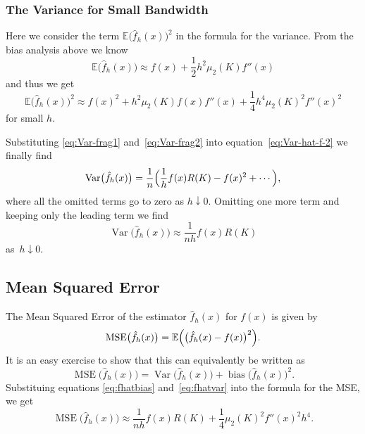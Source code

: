 \documentclass[
  a4paper,
]{article}
\theoremstyle{definition}
\theoremstyle{definition}
\theoremstyle{definition}
\theoremstyle{definition}
\theoremstyle{remark}
\begin{document}
\subsubsection{The Variance for Small Bandwidth}\label{the-variance-for-small-bandwidth}

Here we consider the term \(\mathbb{E}\bigl( \hat f_h(x) \bigr)^2\) in the formula
for the variance. From the bias analysis above we know
\begin{equation*}
    \mathbb{E}\bigl( \hat f_h(x) \bigr)
    \approx f(x) + \frac12 h^2 \mu_2(K) f''(x)
\end{equation*}
and thus we get
\begin{equation}
    \mathbb{E}\bigl( \hat f_h(x) \bigr)^2
    \approx f(x)^2 + h^2 \mu_2(K) f(x) f''(x) + \frac14 h^4 \mu_2(K)^2 f''(x)^2
                             \label{eq:Var-frag2}
\end{equation}
for small \(h\).

Substituting \eqref{eq:Var-frag1} and~\eqref{eq:Var-frag2} into
equation~\eqref{eq:Var-hat-f-2} we finally find
\begin{equation*}
  \mathop{\mathrm{Var}}\bigl( \hat f_h(x) \bigr)
  = \frac{1}{n} \Bigl(
    \frac{1}{h} f(x) R(K)
    - f(x)^2
    + \cdots
   \Bigr),
\end{equation*}
where all the omitted terms go to zero as \(h \downarrow 0\).
Omitting one more term and keeping only the leading term
we find
\begin{equation}
  \mathop{\mathrm{Var}}\bigl( \hat f_h(x) \bigr)
  \approx \frac{1}{nh} f(x) R(K)     \label{eq:fhatvar}
\end{equation}
as~\(h\downarrow 0\).

\subsection{Mean Squared Error}\label{mean-squared-error}

The Mean Squared Error of the estimator \(\hat f_h(x)\) for \(f(x)\) is given
by
\begin{equation*}
  \mathop{\mathrm{MSE}}\nolimits\bigl( \hat f_h(x) \bigr)
  = \mathbb{E}\Bigl( \bigl( \hat f_h(x) - f(x) \bigr)^2 \Bigr).
\end{equation*}
It is an easy exercise to show that this can equivalently be written as
\begin{equation*}
  \mathop{\mathrm{MSE}}\nolimits\bigl( \hat f_h(x) \bigr)
  = \mathop{\mathrm{Var}}\bigl( \hat f_h(x) \bigr) + \mathop{\mathrm{bias}}\bigl( \hat f_h(x) \bigr)^2.
\end{equation*}
Substituing equations \eqref{eq:fhatbias} and~\eqref{eq:fhatvar} into
the formula for the MSE, we get
\begin{equation}
  \mathop{\mathrm{MSE}}\nolimits\bigl( \hat f_h(x) \bigr)
  \approx \frac{1}{nh} f(x) R(K) + \frac14 \mu_2(K)^2 f''(x)^2 h^4.
                           \label{eq:f-hat-MSE}
\end{equation}
\end{document}
